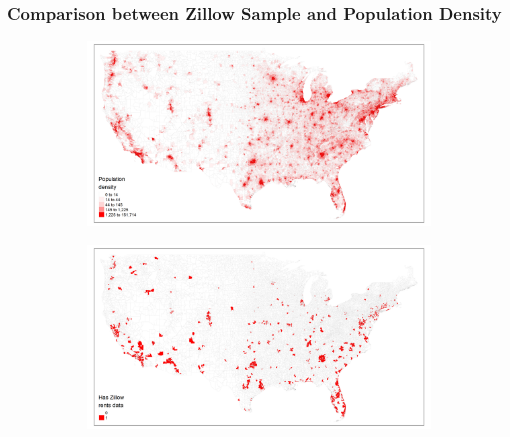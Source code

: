 \documentclass[aspectratio=169, t]{beamer}
\begin{document}
\begin{frame}[label = zillow_pop_density]
	\frametitle{Comparison between Zillow Sample and Population Density}
    \begin{figure}
    	\centering
	\vspace{10mm}
	\hspace{-23mm}
    	\begin{subfigure}{0.40\textwidth}
    		\includegraphics[scale = 0.32]{maps_US/output/USPS_zipcodes_pop_density.png}
    	\end{subfigure}%
	\quad\quad\quad\quad\quad\quad
        \begin{subfigure}{0.40\textwidth}
        	\includegraphics[scale = 0.32]{maps_US/output/USPS_zipcodes_zillow_data.png}
        \end{subfigure}
    \end{figure}
	\hyperlink{zillow_data}{}
\end{frame}
\end{document}
